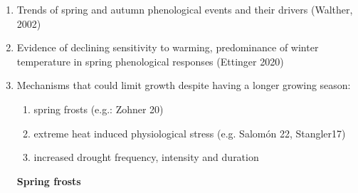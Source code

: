 \documentclass{article}
\begin{document}
\begin{enumerate}
	\item  Trends of spring and autumn phenological events and their drivers (Walther, 2002)
	\item Evidence of declining sensitivity to warming, predominance of winter temperature in spring phenological responses (Ettinger 2020)
	\item Mechanisms that could limit growth despite having a longer growing season:
		\begin{enumerate} 
			\item spring frosts (e.g.: Zohner 20)
			\item extreme heat induced physiological stress (e.g. Salomón 22, Stangler17)
			\item increased drought frequency, intensity and duration 
		\end{enumerate}
		\textbf{Spring frosts} \\
\end{enumerate}
\end{document}
